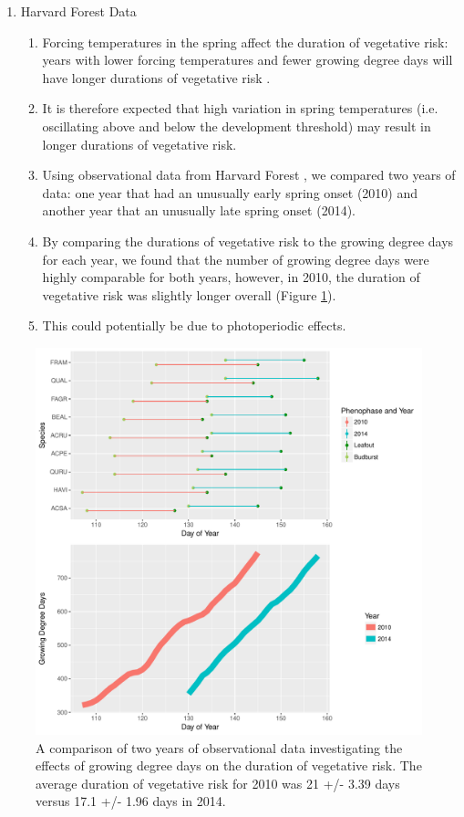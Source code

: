 \documentclass{article}\usepackage[]{graphicx}\usepackage[]{color}
\begin{document}
\begin{enumerate}
\item Harvard Forest Data
\begin{enumerate}
\item Forcing temperatures in the spring affect the duration of vegetative risk: years with lower forcing temperatures and fewer growing degree days will have longer durations of vegetative risk \citep{Donnelly2017}.
\item It is therefore expected that high variation in spring temperatures (i.e. oscillating above and below the development threshold) may result in longer durations of vegetative risk.
\item Using observational data from Harvard Forest \citep{Okeefe2014}, we compared two years of data: one year that had an unusually early spring onset (2010) and another year that an unusually late spring onset (2014).
\item By comparing the durations of vegetative risk to the growing degree days for each year, we found that the number of growing degree days were highly comparable for both years, however, in 2010, the duration of vegetative risk was slightly longer overall (Figure \ref{fig:forest}). 
\item This could potentially be due to photoperiodic effects. 
\end{enumerate}
\end {enumerate}

\begin{figure} [H] 
\begin{center}
\caption{A comparison of two years of observational data investigating the effects of growing degree days on the duration of vegetative risk. The average duration of vegetative risk for 2010 was 21 +/- 3.39 days versus 17.1 +/- 1.96 days in 2014.}\label{fig:forest}
\includegraphics{..//figure/HF_gddTime.pdf}
\end{center}
\end{figure}
\end{document}
